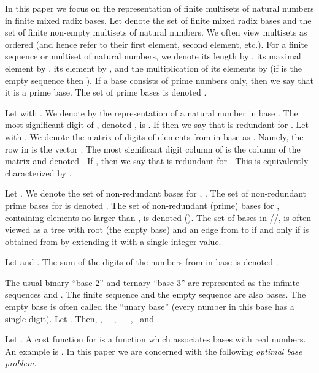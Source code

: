 \documentclass[envcountsame]{llncs}
\begin{document}
In this paper we focus on the representation of finite multisets of
natural numbers in finite mixed radix bases.  Let  denote the
set of finite mixed radix bases and  the set of finite
non-empty multisets of natural numbers. We often view multisets as
ordered (and hence refer to their first element, second element, etc.).
For a finite sequence or multiset  of natural numbers, we denote
its length by , its maximal element by , its 
element by , and the multiplication of its elements by  (if  is the empty sequence then ).
If a base consists of prime numbers only, then we say that it is a
prime base. The set of prime bases is denoted .

Let  with . We denote by  the representation of a natural number  in base
. The most significant digit
 of , denoted , is
.  If  then we say that  is redundant for .
Let  with . We denote the 
matrix of digits of elements from  in base  as
. Namely, the  row in  is the vector
. The most significant digit column of  is the
 column of the matrix and denoted .  If
, then we say that  is redundant
for .
This is equivalently characterized by .

\begin{definition}
\label{def:nrb}
  Let . We denote the set of non-redundant bases for
  , . The set of  
  non-redundant prime bases for  is denoted . 
  \pagebreak
The set of non-redundant (prime) bases for , containing elements
  no larger than , is denoted 
  (). 
The set of bases in //, is
  often viewed as a tree with root  (the empty base) and an
  edge from  to  if and only if  is obtained from  by
  extending it with a single integer value.
\end{definition}


\begin{definition}[]\label{def:sumDigits}
  Let  and .  The sum of the digits of
  the numbers from  in base  is denoted .
\end{definition}


\begin{example}
  The usual binary ``base 2'' and ternary ``base 3'' are represented
  as the infinite sequences  and
  . The finite sequence
   and the empty sequence  are
  also bases. The empty base is often called the ``unary base''
  (every number in this base has a single digit).  
Let .  Then, 
  ,~~
  , ~~
  , ~and
  .
\end{example}

Let . A cost function for  is a function
 which associates bases with real
numbers. An example is .
In this paper we are concerned with the following \emph{optimal base
problem}. 
\end{document}
